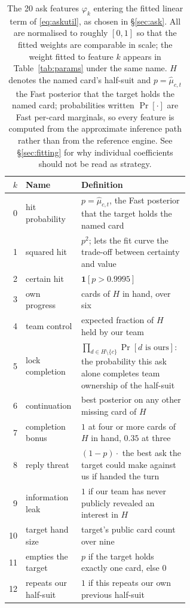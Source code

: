 \documentclass[11pt]{article}
\theoremstyle{definition}
\newcommand{\numAskFeats}{20}
\begin{document}
\begin{table}[ht]
\centering
\caption{The \numAskFeats{} ask features $\varphi_k$ entering the fitted linear
term of \eqref{eq:askutil}, as chosen in \S\ref{sec:ask}. All are normalised to
roughly $[0,1]$ so that the fitted weights are comparable in scale; the weight
fitted to feature $k$ appears in Table~\ref{tab:params} under the same name. $H$
denotes the named card's half-suit and $p = \hat\mu_{c,t}$ the Fast posterior
that the target holds the named card; probabilities written $\Pr[\cdot]$ are Fast
per-card marginals, so every feature is computed from the approximate inference
path rather than from the reference engine. See \S\ref{sec:fitting} for why
individual coefficients should not be read as strategy.}
\label{tab:features}
\small
\begin{tabular}{rlp{0.60\linewidth}}
\toprule
$k$ & Name & Definition \\
\midrule
0  & hit probability     & $p = \hat\mu_{c,t}$, the Fast posterior that the target holds the named card \\
1  & squared hit         & $p^2$; lets the fit curve the trade-off between certainty and value \\
2  & certain hit         & $\mathbf{1}[p > 0.9995]$ \\
3  & own progress        & cards of $H$ in hand, over six \\
4  & team control        & expected fraction of $H$ held by our team \\
5  & lock completion     & $\prod_{d \in H \setminus \{c\}} \Pr[d \text{ is ours}]$: the probability this ask alone completes team ownership of the half-suit \\
6  & continuation        & best posterior on any other missing card of $H$ \\
7  & completion bonus    & $1$ at four or more cards of $H$ in hand, $0.35$ at three \\
8  & reply threat        & $(1-p)\cdot$ the best ask the target could make against us if handed the turn \\
9  & information leak    & $1$ if our team has never publicly revealed an interest in $H$ \\
10 & target hand size    & target's public card count over nine \\
11 & empties the target  & $p$ if the target holds exactly one card, else $0$ \\
12 & repeats our half-suit & $1$ if this repeats our own previous half-suit \\

\end{tabular}
\end{table}
\end{document}
